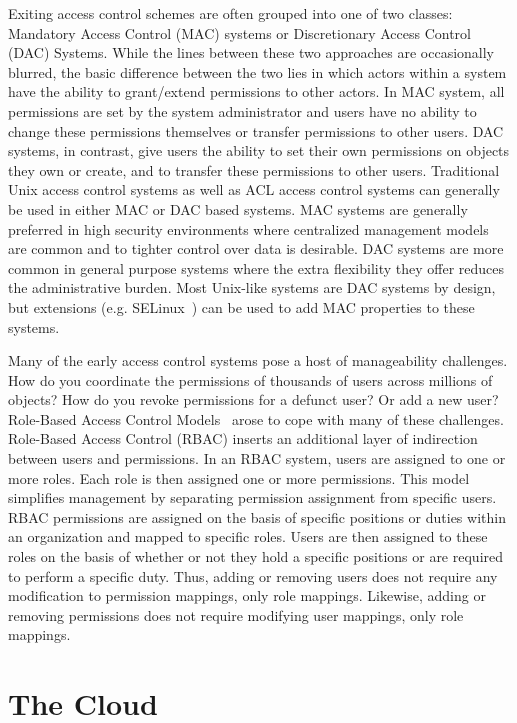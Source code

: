 Exiting access control schemes are often grouped into one of two
classes: Mandatory Access Control (MAC) systems or Discretionary
Access Control (DAC) Systems. While the lines between these two
approaches are occasionally blurred, the basic difference between the
two lies in which actors within a system have the ability to
grant/extend permissions to other actors. In MAC system, all
permissions are set by the system administrator and users have no
ability to change these permissions themselves or transfer permissions
to other users. DAC systems, in contrast, give users the ability to
set their own permissions on objects they own or create, and to
transfer these permissions to other users. Traditional Unix access
control systems as well as ACL access control systems can generally be
used in either MAC or DAC based systems. MAC systems are generally
preferred in high security environments where centralized management
models are common and to tighter control over data is desirable. DAC
systems are more common in general purpose systems where the extra
flexibility they offer reduces the administrative burden. Most
Unix-like systems are DAC systems by design, but extensions
(e.g. SELinux~\cite{loscocco2001}) can be used to add MAC properties
to these systems.

Many of the early access control systems pose a host of manageability
challenges. How do you coordinate the permissions of thousands of
users across millions of objects? How do you revoke permissions for a
defunct user? Or add a new user?  Role-Based Access Control
Models~\cite{sandhu1996} arose to cope with many of these challenges.
Role-Based Access Control (RBAC) inserts an additional layer of
indirection between users and permissions. In an RBAC system, users
are assigned to one or more roles. Each role is then assigned one or
more permissions. This model simplifies management by separating
permission assignment from specific users. RBAC permissions are
assigned on the basis of specific positions or duties within an
organization and mapped to specific roles. Users are then assigned to
these roles on the basis of whether or not they hold a specific
positions or are required to perform a specific duty. Thus, adding or
removing users does not require any modification to permission
mappings, only role mappings. Likewise, adding or removing permissions
does not require modifying user mappings, only role mappings.

\section{The Cloud}
\label{chap:background:cloud}


